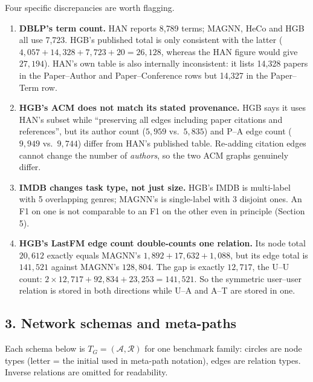 \noindent Four specific discrepancies are worth flagging.
\begin{enumerate}\itemsep2pt
\item \textbf{DBLP's term count.} HAN reports 8{,}789 terms; MAGNN, HeCo and HGB all use 7{,}723.
  HGB's published total is only consistent with the latter
  ($4{,}057+14{,}328+7{,}723+20=26{,}128$, whereas the HAN figure would give $27{,}194$). HAN's own
  table is also internally inconsistent: it lists 14{,}328 papers in the Paper--Author and
  Paper--Conference rows but 14{,}327 in the Paper--Term row.
\item \textbf{HGB's ACM does not match its stated provenance.} HGB says it uses HAN's subset while
  ``preserving all edges including paper citations and references'', but its author count
  ($5{,}959$ vs.\ $5{,}835$) and P--A edge count ($9{,}949$ vs.\ $9{,}744$) differ from HAN's
  published table. Re-adding citation edges cannot change the number of \emph{authors}, so the two
  ACM graphs genuinely differ.
\item \textbf{IMDB changes task type, not just size.} HGB's IMDB is multi-label with 5 overlapping
  genres; MAGNN's is single-label with 3 disjoint ones. An F1 on one is not comparable to an F1 on
  the other even in principle (Section 5).
\item \textbf{HGB's LastFM edge count double-counts one relation.} Its node total $20{,}612$
  exactly equals MAGNN's $1{,}892+17{,}632+1{,}088$, but its edge total is $141{,}521$ against
  MAGNN's $128{,}804$. The gap is exactly $12{,}717$, the U--U count:
  $2\times12{,}717+92{,}834+23{,}253=141{,}521$. So the symmetric user--user relation is stored in
  both directions while U--A and A--T are stored in one.
\end{enumerate}

\subsection*{3. Network schemas and meta-paths}

Each schema below is $T_G=(\mathcal{A},\mathcal{R})$ for one benchmark family: circles are node
types (letter = the initial used in meta-path notation), edges are relation types. Inverse
relations are omitted for readability.

